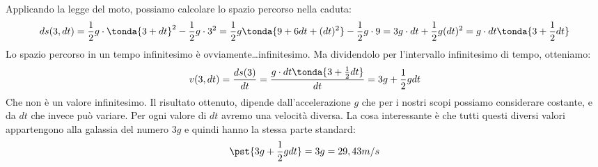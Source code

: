 Applicando la legge del moto, possiamo calcolare lo spazio percorso nella 
caduta: 
\[ds(3, dt)=\frac{1}{2}g \cdot \tonda{3+dt}^2-\frac{1}{2}g \cdot 3^2= 
\frac{1}{2}g\tonda{9+6 dt+(dt)^2}-\frac{1}{2}g \cdot 9 = 
3 g\cdot dt+\frac{1}{2} g (dt)^2 =
g \cdot dt \tonda{3+ \frac{1}{2} dt}\] 
Lo spazio percorso in un tempo infinitesimo è ovviamente\dots infinitesimo.
Ma dividendolo per l'intervallo infinitesimo di tempo, otteniamo:
\[v(3, dt)=\frac{ds(3)}{dt}=
  \frac{g \cdot dt \tonda{3+ \frac{1}{2} dt}}{dt}=
  3g+\frac{1}{2}g dt\] 
Che non è un valore infinitesimo. 
Il risultato ottenuto, dipende dall'accelerazione \(g\) che per i nostri 
scopi possiamo considerare costante, e da \(dt\) che invece può variare. Per 
ogni valore di \(dt\) avremo una velocità diversa.
La cosa interessante è che tutti questi diversi valori appartengono alla 
galassia del numero \(3g\) e quindi hanno la stessa parte standard:
\[\pst{3g+\frac{1}{2}g dt} = 3g = 29,43m/s\]


